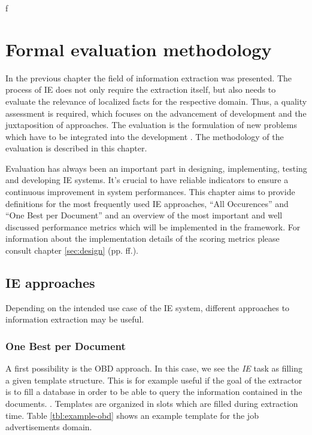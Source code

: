 f\section{Formal evaluation methodology}
\label{sec:evaluation-methodology}

In the previous chapter the field of information extraction was presented. The process of IE does not only require the extraction itself, but also needs to evaluate the relevance of localized facts for the respective domain. Thus, a quality assessment is required, which focuses on the advancement of development and the juxtaposition of approaches. The evaluation is the formulation of new problems which have to be integrated into the development \cite{Linsmayr:2010}. The methodology of the evaluation is described in this chapter.

Evaluation has always been an important part in designing, implementing, testing and developing \gls{IE} systems. It's crucial to have reliable indicators to ensure a continuous improvement in system performances. This chapter aims to provide definitions for the most frequently used \gls{IE} approaches, \enquote{All Occurences} and \enquote{One Best per Document} and an overview of the most important and well discussed performance metrics which will be implemented in the framework. For information about the implementation details of the scoring metrics please consult chapter \ref{sec:design} (pp. \pageref{sec:design}ff.).

\subsection{\gls{IE} approaches}
\label{sec:ie-approaches}
Depending on the intended use case of the IE system, different approaches to information extraction may be useful. 

\subsubsection{One Best per Document}A first possibility is the \gls{OBD} approach. In this case, we see the \textit{IE} task as filling a given template structure. This is for example useful if the goal of the extractor is to fill a database in order to be able to query the information contained in the documents. \cite{Sitter:2004}. Templates are organized in slots which are filled during extraction time. Table \ref{tbl:example-obd} shows an example template for the job advertisements domain.

